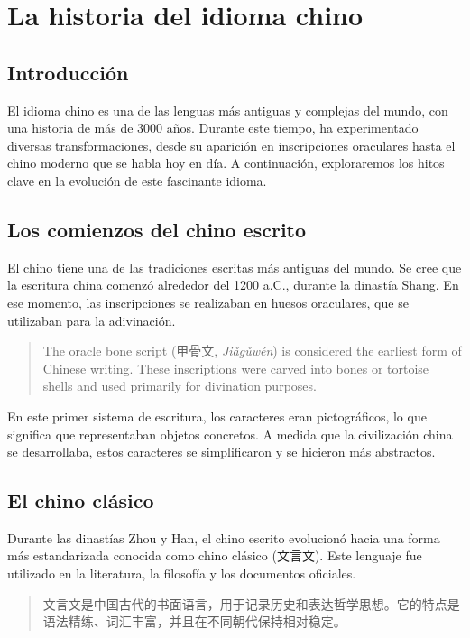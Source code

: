 \chapter{La historia del idioma chino}

\section{Introducción}

El idioma chino es una de las lenguas más antiguas y complejas del mundo, con una historia de más de 3000 años. Durante este tiempo, ha experimentado diversas transformaciones, desde su aparición en inscripciones oraculares hasta el chino moderno que se habla hoy en día. A continuación, exploraremos los hitos clave en la evolución de este fascinante idioma.

\section{Los comienzos del chino escrito}

El chino tiene una de las tradiciones escritas más antiguas del mundo. Se cree que la escritura china comenzó alrededor del 1200 a.C., durante la dinastía Shang. En ese momento, las inscripciones se realizaban en huesos oraculares, que se utilizaban para la adivinación.

\begin{quote}
The oracle bone script (甲骨文, \textit{Jiǎgǔwén}) is considered the earliest form of Chinese writing. These inscriptions were carved into bones or tortoise shells and used primarily for divination purposes.
\end{quote}

En este primer sistema de escritura, los caracteres eran pictográficos, lo que significa que representaban objetos concretos. A medida que la civilización china se desarrollaba, estos caracteres se simplificaron y se hicieron más abstractos.

\section{El chino clásico}

Durante las dinastías Zhou y Han, el chino escrito evolucionó hacia una forma más estandarizada conocida como chino clásico (文言文). Este lenguaje fue utilizado en la literatura, la filosofía y los documentos oficiales.

\begin{quote}
文言文是中国古代的书面语言，用于记录历史和表达哲学思想。它的特点是语法精练、词汇丰富，并且在不同朝代保持相对稳定。
\end{quote}

